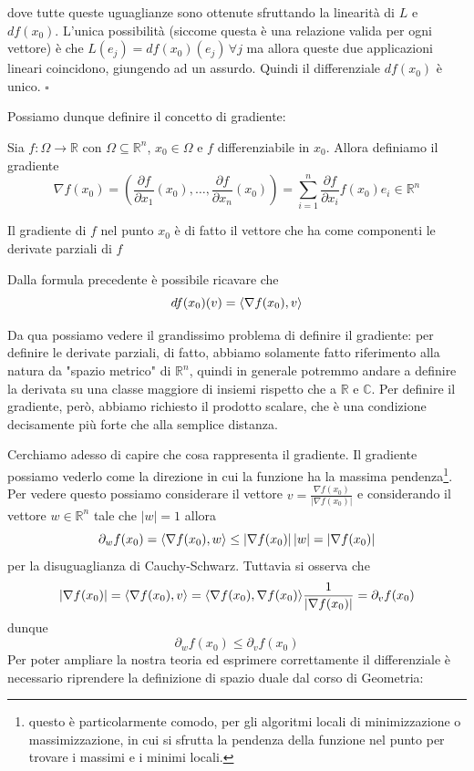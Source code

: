 dove tutte queste uguaglianze sono ottenute sfruttando la linearità di $L$ e $df(x_0)$. L'unica possibilità (siccome questa è una relazione valida per ogni vettore) è che $L(e_j) = df(x_0)(e_j) \, \forall j$ ma allora queste due applicazioni lineari coincidono, giungendo ad un assurdo. Quindi il differenziale $df(x_0)$ è unico.
\hfill $\square$

\noindent Possiamo dunque definire il concetto di gradiente:

\vspace{0.5cm}
\begin{definition}[\textcolor{blue}{gradiente di una funzione}]
Sia $f: \Omega \to \mathbb{R}$ con $\Omega \subseteq \mathbb{R}^n$, $x_0 \in \Omega$ e $f$ differenziabile in $x_0$. Allora definiamo il gradiente $$\nabla{f(x_0)} = \left( \frac{\partial f}{\partial x_1}(x_0), \ldots, \frac{\partial f}{\partial x_n}(x_0) \right) = \sum_{i=1}^n \frac{\partial f}{\partial x_i}f(x_0)e_i \in \mathbb{R}^n$$
\end{definition}

\begin{remark}
Il gradiente di $f$ nel punto $x_0$ è di fatto il vettore che ha come componenti le derivate parziali di $f$
\end{remark}

\noindent Dalla formula precedente è possibile ricavare che
$$
df(x_0)(v) = \langle \nabla{f(x_0)}, v \rangle
$$

\begin{remark}
Da qua possiamo vedere il grandissimo problema di definire il gradiente: per definire le derivate parziali, di fatto, abbiamo solamente fatto riferimento alla natura da "spazio metrico" di $\mathbb{R}^n$, quindi in generale potremmo andare a definire la derivata su una classe maggiore di insiemi rispetto che a $\mathbb{R}$ e $\mathbb{C}$. Per definire il gradiente, però, abbiamo richiesto il prodotto scalare, che è una condizione decisamente più forte che alla semplice distanza.
\end{remark}

\noindent Cerchiamo adesso di capire che cosa rappresenta il gradiente. Il gradiente possiamo vederlo come la direzione in cui la funzione ha la massima pendenza\footnote{questo è particolarmente comodo, per gli algoritmi locali di minimizzazione o massimizzazione, in cui si sfrutta la pendenza della funzione nel punto per trovare i massimi e i minimi locali.}. Per vedere questo possiamo considerare il vettore $v = \frac{\nabla f(x_0)}{|\nabla f(x_0)|}$ e considerando il vettore $w \in \mathbb{R}^n$ tale che $|w| = 1$ allora
$$
\partial_w f(x_0) = \langle \nabla{f(x_0)}, w \rangle \leq |\nabla{f(x_0)}| \, |w| = |\nabla{f(x_0)}|
$$
per la disuguaglianza di Cauchy-Schwarz. Tuttavia si osserva che
$$
|\nabla{f(x_0)}| = \langle \nabla{f(x_0)}, v \rangle = \langle \nabla{f(x_0)}, \nabla{f(x_0)} \rangle \frac{1}{|\nabla{f(x_0)}|} = \partial_v f(x_0)
$$
dunque
$$
\partial_w f(x_0) \leq \partial_v f(x_0)
$$
Per poter ampliare la nostra teoria ed esprimere correttamente il differenziale è necessario riprendere la definizione di spazio duale dal corso di Geometria:

